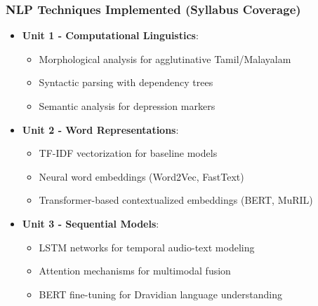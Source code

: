 \documentclass{beamer}
\begin{document}
\begin{frame}
\frametitle{NLP Techniques Implemented (Syllabus Coverage)}
\begin{itemize}
    \item \textbf{Unit 1 - Computational Linguistics}:
    \begin{itemize}
        \item Morphological analysis for agglutinative Tamil/Malayalam
        \item Syntactic parsing with dependency trees
        \item Semantic analysis for depression markers
    \end{itemize}
    \item \textbf{Unit 2 - Word Representations}:
    \begin{itemize}
        \item TF-IDF vectorization for baseline models
        \item Neural word embeddings (Word2Vec, FastText)
        \item Transformer-based contextualized embeddings (BERT, MuRIL)
    \end{itemize}
    \item \textbf{Unit 3 - Sequential Models}:
    \begin{itemize}
        \item LSTM networks for temporal audio-text modeling
        \item Attention mechanisms for multimodal fusion
        \item BERT fine-tuning for Dravidian language understanding
    \end{itemize}
\end{itemize}
\end{frame}
\end{document}
